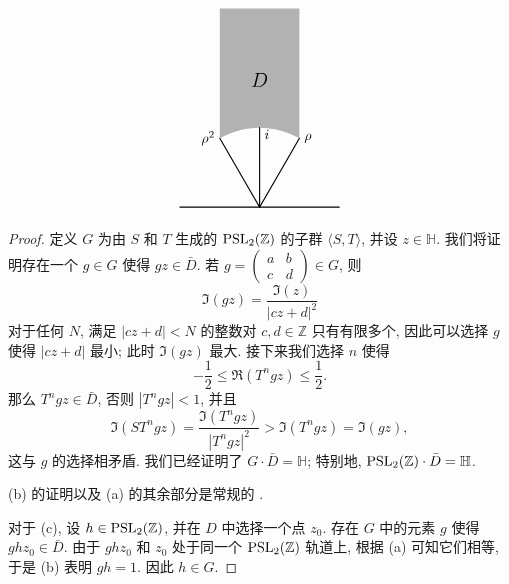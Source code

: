 \begin{proposition}
\begin{minipage}[t]{0.35\textwidth}
\[\begin{tikzpicture}[scale=2, line cap=round, line join=round]
        \fill[gray!60] (-0.5, 2.5) -- (-0.5, \sqthree) 
            arc (120:60:1) -- (0.5, 2.5) -- cycle;

        \draw[thick] (-1, 0) -- (1, 0);
        
        \draw[thick] (0,0) -- (-0.5, \sqthree) coordinate (rho2);
        \draw[thick] (0,0) -- (0, 1) coordinate (i_point);
        \draw[thick] (0,0) -- (0.5, \sqthree) coordinate (rho);


        \node at (0, 1.6) {\Large $D$};
        
        \node[left] at (rho2) {$\rho^2$};
        
        \node[right] at (rho) {$\rho$};
        
        \node[below right, yshift=2pt] at (0, 1) {$i$};

    \end{tikzpicture}
    \]
\end{minipage}
\end{proposition}

\begin{proof}
定义 $G$ 为由 $S$ 和 $T$ 生成的 $\operatorname{PSL}_2(\mathbb{Z})$ 的子群 $\langle S, T \rangle$, 并设 $z \in \mathbb{H}$. 我们将证明存在一个 $g \in G$ 使得 $gz \in \bar{D}$. 若 $g = \begin{pmatrix} a & b \\ c & d \end{pmatrix} \in G$, 则
\[ \Im(gz) = \frac{\Im(z)}{|cz + d|^2} \]
对于任何 $N$, 满足 $|cz + d| < N$ 的整数对 $c, d \in \mathbb{Z}$ 只有有限多个, 因此可以选择 $g$ 使得 $|cz + d|$ 最小; 此时 $\Im(gz)$ 最大. 接下来我们选择 $n$ 使得
\[ -\frac{1}{2} \le \Re(T^n gz) \le \frac{1}{2}. \]
那么 $T^n gz \in \bar{D}$, 否则 $|T^n gz| < 1$, 并且
\[ \Im(ST^n gz) = \frac{\Im(T^n gz)}{|T^n gz|^2} > \Im(T^n gz) = \Im(gz), \]
这与 $g$ 的选择相矛盾. 我们已经证明了 $G \cdot \bar{D} = \mathbb{H}$; 特别地, $\operatorname{PSL}_2(\mathbb{Z}) \cdot \bar{D} = \mathbb{H}$. 

(b) 的证明以及 (a) 的其余部分是常规的 \cite[VII, 1.2]{serre1973}. 

对于 (c), 设 $h \in \operatorname{PSL}_2(\mathbb{Z})$, 并在 $D$ 中选择一个点 $z_0$. 存在 $G$ 中的元素 $g$ 使得 $ghz_0 \in \bar{D}$. 由于 $ghz_0$ 和 $z_0$ 处于同一个 $\operatorname{PSL}_2(\mathbb{Z})$ 轨道上, 根据 (a) 可知它们相等, 于是 (b) 表明 $gh = 1$. 因此 $h \in G$. 
\end{proof}

